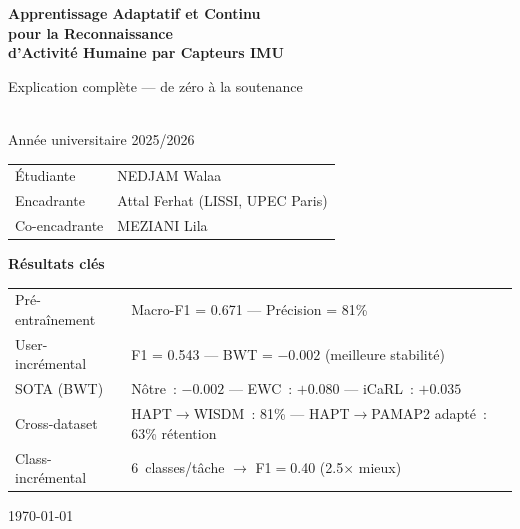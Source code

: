 \documentclass[12pt, a4paper]{article}
\begin{document}
\begin{titlepage}
\centering\vspace*{1.5cm}
{\Huge\bfseries\color{mainblue}
  Apprentissage Adaptatif et Continu\\[0.5em]
  pour la Reconnaissance\\[0.5em]
  d'Activité Humaine par Capteurs IMU\par}
\vspace{0.8cm}
{\large\color{darkgray}Explication complète --- de zéro à la soutenance}
\vspace{1.5cm}

\begin{tcolorbox}[colback=lightblue,colframe=mainblue,width=0.88\textwidth,rounded corners]
\\[4pt]
Année universitaire 2025/2026\\[6pt]
\begin{tabular}{ll}
Étudiante     & NEDJAM Walaa \\
Encadrante    & Attal Ferhat (LISSI, UPEC Paris) \\
Co-encadrante & MEZIANI Lila \\
\end{tabular}
\end{tcolorbox}

\vspace{1cm}
\begin{tcolorbox}[colback=lightgreen,colframe=darkgreen,width=0.88\textwidth,rounded corners]
\centering\textbf{Résultats clés}\\[4pt]
\begin{tabular}{ll}
Pré-entraînement   & Macro-F1 = 0.671 --- Précision = 81\% \\
User-incrémental   & F1 = 0.543 --- BWT = $-0.002$ (meilleure stabilité) \\
SOTA (BWT)         & Nôtre~: $-0.002$ --- EWC~: $+0.080$ --- iCaRL~: $+0.035$ \\
Cross-dataset      & HAPT$\to$WISDM~: 81\% --- HAPT$\to$PAMAP2 adapté~: 63\% rétention \\
Class-incrémental  & 6~classes/tâche $\to$ F1$=$0.40 (2.5$\times$ mieux) \\
\end{tabular}
\end{tcolorbox}

\vfill{\large\today}
\end{titlepage}
\end{document}
